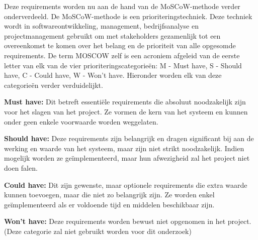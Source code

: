 Deze requirements worden nu aan de hand van de MoSCoW-methode verder onderverdeeld. De MoSCoW-methode is een prioriteringstechniek. Deze techniek wordt in softwareontwikkeling, management, bedrijfsanalyse en projectmanagement gebruikt om met stakeholders gezamenlijk tot een overeenkomst te komen over het belang en de prioriteit van alle opgesomde requirements. De term MOSCOW zelf is een acroniem afgeleid van de eerste letter van elk van de vier prioriteringscategorieën: M - Must have, S - Should have, C - Could have, W - Won't have. Hieronder worden elk van deze categorieën verder verduidelijkt.

\vspace{\baselineskip}

\textbf{Must have:} Dit betreft essentiële requirements die absoluut noodzakelijk zijn voor het slagen van het project. Ze vormen de kern van het systeem en kunnen onder geen enkele voorwaarde worden weggelaten.

\vspace{\baselineskip}

\textbf{Should have:} Deze requirements zijn belangrijk en dragen significant bij aan de werking en waarde van het systeem, maar zijn niet strikt noodzakelijk. Indien mogelijk worden ze geïmplementeerd, maar hun afwezigheid zal het project niet doen falen.

\vspace{\baselineskip}

\textbf{Could have:} Dit zijn gewenste, maar optionele requirements die extra waarde kunnen toevoegen, maar die niet zo belangrijk zijn. Ze worden enkel geïmplementeerd als er voldoende tijd en middelen beschikbaar zijn.

\vspace{\baselineskip}

\textbf{Won’t have:} Deze requirements worden bewust niet opgenomen in het project. (Deze categorie zal niet gebruikt worden voor dit onderzoek)

\vspace{\baselineskip}

